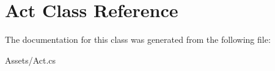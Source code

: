 \hypertarget{classAct}{}\section{Act Class Reference}
\label{classAct}


The documentation for this class was generated from the following file\+:\begin{DoxyCompactItemize}
\item 
Assets/Act.\+cs\end{DoxyCompactItemize}
